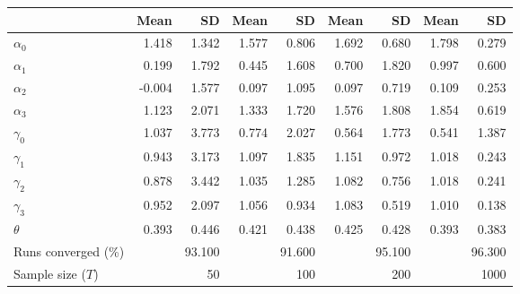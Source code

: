 
\begin{tabular}[t]{lrrrrrrrr}
\toprule
  & Mean & SD & Mean  & SD  & Mean   & SD   & Mean    & SD   \\
\midrule
$\alpha_{0}$ & 1.418 & 1.342 & 1.577 & 0.806 & 1.692 & 0.680 & 1.798 & 0.279\\
$\alpha_{1}$ & 0.199 & 1.792 & 0.445 & 1.608 & 0.700 & 1.820 & 0.997 & 0.600\\
$\alpha_{2}$ & -0.004 & 1.577 & 0.097 & 1.095 & 0.097 & 0.719 & 0.109 & 0.253\\
$\alpha_{3}$ & 1.123 & 2.071 & 1.333 & 1.720 & 1.576 & 1.808 & 1.854 & 0.619\\
$\gamma_{0}$ & 1.037 & 3.773 & 0.774 & 2.027 & 0.564 & 1.773 & 0.541 & 1.387\\
$\gamma_{1}$ & 0.943 & 3.173 & 1.097 & 1.835 & 1.151 & 0.972 & 1.018 & 0.243\\
$\gamma_{2}$ & 0.878 & 3.442 & 1.035 & 1.285 & 1.082 & 0.756 & 1.018 & 0.241\\
$\gamma_{3}$ & 0.952 & 2.097 & 1.056 & 0.934 & 1.083 & 0.519 & 1.010 & 0.138\\
$\theta$ & 0.393 & 0.446 & 0.421 & 0.438 & 0.425 & 0.428 & 0.393 & 0.383\\
Runs converged (\%) &  & 93.100 &  & 91.600 &  & 95.100 &  & 96.300\\
Sample size ($T$) &  & 50 &  & 100 &  & 200 &  & 1000\\
\bottomrule
\end{tabular}
